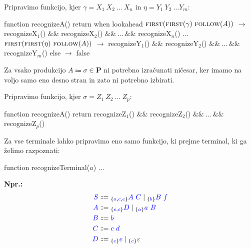 \documentclass{article}
\newcommand{\Ex}{\textbf{Npr.:}\ }
\newcommand{\FIRST}{\textsc{first}}
\newcommand{\FOLLOW}{\textsc{follow}}
\newcommand{\Set}[1]{\mathbf{#1}}
\newcommand{\Symbol}[1]{\textcolor{blue}{#1}}
\newcommand{\Productions}{\Set{P}}
\newcommand{\Null}{\varepsilon}
\newcommand{\Arrow}{\Coloneq}
\newcommand{\Seq}{\ }
\newcommand{\Union}{\mathrel{|}}
\newcommand{\Lookahead}[1]{{}_{\{{#1}\}}}
\begin{document}
Pripravimo funkcijo, kjer $\gamma = X_1 \Seq X_2 \Seq \dots \Seq X_n$ in $\eta = Y_1 \Seq Y_2 \Seq \dots Y_m$:

\begin{algorithm}
  function recognizeA()
    return when lookahead
      $\FIRST(\FIRST(\gamma) \Seq \FOLLOW(A))$ $\rightarrow$ recognizeX$_1$() $\&\&$ recognizeX$_2$() $\&\&\ \dots\ \&\&$ recognizeX$_n$()
      $\dots$
      $\FIRST(\FIRST(\eta) \Seq \FOLLOW(A))$ $\rightarrow$ recognizeY$_1$() $\&\&$ recognizeY$_2$() $\&\&\ \dots\ \&\&$ recognizeY$_m$()
      else $\rightarrow$ false
\end{algorithm}

Za vsako produkcijo $A \Arrow \sigma \in \Productions$ ni potrebno izračunati ničesar, ker imamo na voljo samo eno desno stran in zato ni potrebno izbirati.

Pripravimo funkcijo, kjer $\sigma = Z_1 \Seq Z_2 \Seq \dots \Seq Z_p$:

\begin{algorithm}
  function recognizeA()
    return recognizeZ$_1$() $\&\&$ recognizeZ$_2$() $\&\&\ \dots\ \&\&$ recognizeZ$_p$()
\end{algorithm}

Za vse terminale lahko pripravimo eno samo funkcijo, ki prejme terminal, ki ga želimo razpoznati:
\begin{algorithm}
  function recognizeTerminal($a$)
    $\dots$
\end{algorithm}

\Ex
\begin{equation*}
  \begin{aligned}
    \Symbol{S} &\Arrow \Lookahead{\Symbol{a}, \Symbol{c}, \Symbol{e}} \Symbol{A} \Seq \Symbol{C} \Union \Lookahead{\Symbol{b}} \Symbol{B} \Seq \Symbol{f} \\
    \Symbol{A} &\Arrow \Lookahead{\Symbol{e}, \Symbol{c}} \Symbol{D} \Union \Lookahead{\Symbol{a}} \Symbol{a} \Seq \Symbol{B} \\
    \Symbol{B} &\Arrow \Symbol{b}\\
    \Symbol{C} &\Arrow \Symbol{c} \Seq \Symbol{d}\\
    \Symbol{D} &\Arrow \Lookahead{\Symbol{e}} \Symbol{e} \Union \Lookahead{\Symbol{c}} \Null
  \end{aligned}
\end{equation*}
\end{document}
